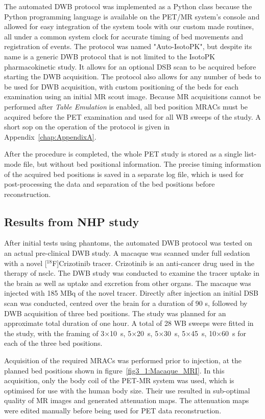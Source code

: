 The automated DWB protocol was implemented as a Python class because the Python programming language is available on the PET/MR system's console and allowed for easy integration of the system tools with our custom made routines, all under a common system clock for accurate timing of bed movements and registration of events.
The protocol was named "Auto-IsotoPK", but despite its name is a generic DWB protocol that is not limited to the IsotoPK pharmacokinetic study. It allows for an optional DSB scan to be acquired before starting the DWB acquisition. The protocol also allows for any number of beds to be used for DWB acquisition, with custom positioning of the beds for each examination using an initial MR scout image. 
Because MR acquisitions cannot be performed after \textit{Table Emulation} is enabled, all bed position MRACs must be acquired before the PET examination and used for all WB sweeps of the study.
A short \gls{sop} on the operation of the protocol is given in Appendix~\ref{chap:AppendixA}.

After the procedure is completed, the whole PET study is stored as a single list-mode file, but without bed positional information. The precise timing information of the acquired bed positions is saved in a separate log file, which is used for post-processing the data and separation of the bed positions before reconstruction.  

\subsection{Results from NHP study}
After initial tests using phantoms, the automated DWB protocol was tested on an actual pre-clinical DWB study. A macaque was scanned under full sedation with a novel [$^{18}$F]Crizotinib tracer. Crizotinib is an anti-cancer drug used in the therapy of \gls{nsclc}.
The DWB study was conducted to examine the tracer uptake in the brain as well as uptake and excretion from other organs. The macaque was injected with 185 \si{\mega \becquerel} of the novel tracer. Directly after injection an initial DSB scan was conducted, centred over the brain for a duration of 90 s, followed by DWB acquisition of three bed positions. The study was planned for an approximate total duration of one hour. A total of 28 WB sweeps were fitted in the study, with the framing of 3$\times$10~{s}, 5$\times$20~{s}, 5$\times$30~{s}, 5$\times$45~{s}, 10$\times$60~{s} for each of the three bed positions.

Acquisition of the required MRACs was performed prior to injection, at the planned bed positions shown in figure~\ref{fig3_1:Macaque_MRI}. In this acquisition, only the body coil of the PET-MR system was used, which is optimised for use with the human body size. Their use resulted in sub-optimal quality of MR images and generated attenuation maps. The attenuation maps were edited manually before being used for PET data reconstruction.

